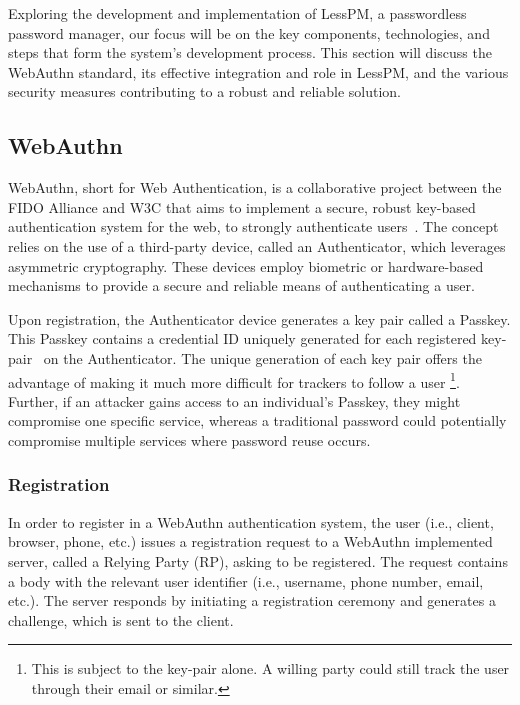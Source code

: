 Exploring the development and implementation of LessPM, a passwordless password manager, our focus will be on the key
components, technologies, and steps that form the system's development process.
This section will discuss the WebAuthn standard, its effective integration and role in LessPM, and the various security
measures contributing to a robust and reliable solution.


\newcommand{\credIdentifier}{\footnote{There is a requirement to check whether the credential identifier, generated by the Authenticator
device exsits on the server.
For further discussions on this topic, see section \hyperref[sec:futurework]{Future work}}}

\newcommand{\navigatorApi}{\footnote{In LessPM's case, this is the \textit{navigator.credentials} API provided by the browser.}}

\subsection*{WebAuthn}
WebAuthn, short for Web Authentication, is a collaborative project between the FIDO Alliance and W3C that aims to
implement a secure, robust key-based authentication system for the web, to strongly authenticate users~\cite{webauthn_level_2}.
The concept relies on the use of a third-party device, called an Authenticator, which leverages asymmetric cryptography.
These devices employ biometric or hardware-based mechanisms to provide a secure and reliable means of authenticating a
user.

Upon registration, the Authenticator device generates a key pair called a Passkey.
This Passkey contains a credential ID uniquely generated for each registered key-pair~\cite{webauthn_credential_id,webauthn_public_key_credential}
on the Authenticator.
The unique generation of each key pair offers the advantage of making it much more difficult for trackers to follow a user
\footnote{This is subject to the key-pair alone. A willing party could still track the user through their email or similar.}.
Further, if an attacker gains access to an individual's Passkey, they might compromise one specific service, whereas
a traditional password could potentially compromise multiple services where password reuse occurs\cite{wang2018next}.
\newpage
\subsubsection*{Registration}
In order to register in a WebAuthn authentication system, the user (i.e., client, browser, phone, etc.) issues a registration request to a
WebAuthn implemented server, called a Relying Party (RP), asking to be registered.
The request contains a body with the relevant user identifier (i.e., username, phone number, email, etc.).
The server responds by initiating a registration ceremony and generates a challenge, which is sent to the client.

